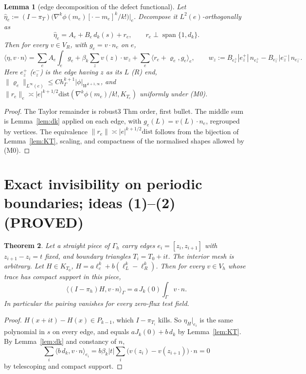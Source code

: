 \documentclass[11pt]{article}
\newtheorem{theorem}{Theorem}[section]
\newtheorem{lemma}[theorem]{Lemma}
\theoremstyle{remark}
\newcommand{\hG}{h_\Gamma}
\newcommand{\Gh}{\Gamma_h}
\newcommand{\ip}[2]{\langle #1,#2\rangle}
\begin{document}
\begin{lemma}[edge decomposition of the defect functional]\label{lem:dec}
Let $\hat\eta_e:=(I-\pi_T)\big(\nabla^k\phi(m_e)[\cdot-m_e]^k/k!\big)|_e$. Decompose it $L^2(e)$-orthogonally as
\[
\hat\eta_e=A_e+B_e\,d_k(s)+r_e,\qquad r_e\perp\operatorname{span}\{1,d_k\}.
\]
Then for every $v\in V_R$, with $g_e=v\cdot n_e$ on $e$,
\[
\ip{\eta}{v\cdot n}=\sum_eA_e\int_eg_e+\beta_k\sum_{z}v(z)\cdot w_z+\sum_e\ip{r_e+\varrho_e}{g_e}_e,\qquad
w_z:=B_{e^+_z}|e^+_z|\,n_{e^+_z}-B_{e^-_z}|e^-_z|\,n_{e^-_z}.
\]
Here $e^+_z$ ($e^-_z$) is the edge having $z$ as its $L$ ($R$) end, $\|\varrho_e\|_{L^\infty(e)}\le C\hG^{k+1}|\phi|_{W^{k+1,\infty}}$, and
$\|r_e\|_e\asymp|e|^{k+1/2}\mathrm{dist}(\nabla^k\phi(m_e)/k!,K_{T_e})$ uniformly under (M0).
\end{lemma}
\begin{proof}
The Taylor remainder is robust3 Thm order, first bullet. The middle sum is Lemma~\ref{lem:dk} applied on each edge, with
$g_e(L)=v(L)\cdot n_e$, regrouped by vertices. The equivalence $\|r_e\|\asymp|e|^{k+1/2}\mathrm{dist}$ follows from the bijection of
Lemma~\ref{lem:KT}, scaling, and compactness of the normalised shapes allowed by (M0).
\end{proof}

\section{Exact invisibility on periodic boundaries; ideas (1)--(2) (PROVED)}
\begin{theorem}\label{thm:inv}
Let a straight piece of $\Gh$ carry edges $e_i=[z_i,z_{i+1}]$ with $z_{i+1}-z_i=t$ fixed, and boundary triangles
$T_i=T_0+it$. The interior mesh is arbitrary. Let $H\in K_{T_0}$, $H=a\ell_c^k+b(\ell_L^k-\ell_R^k)$. Then for every $v\in V_h$
whose trace has compact support in this piece,
\[
\ip{(I-\pi_h)H}{v\cdot n}_\Gamma=a\,J_k(0)\int_\Gamma v\cdot n .
\]
In particular the pairing vanishes for every zero-flux test field.
\end{theorem}
\begin{proof}
$H(x+it)-H(x)\in P_{k-1}$, which $I-\pi_{T_i}$ kills. So $\eta_H|_{e_i}$ is the same polynomial in $s$ on every edge, and equals
$aJ_k(0)+b\,d_k$ by Lemma~\ref{lem:KT}. By Lemma~\ref{lem:dk} and constancy of $n$,
\[
\sum_i\ip{b\,d_k}{v\cdot n}_{e_i}=b\beta_k|t|\sum_i\big(v(z_i)-v(z_{i+1})\big)\cdot n=0
\]
by telescoping and compact support.
\end{proof}
\end{document}
